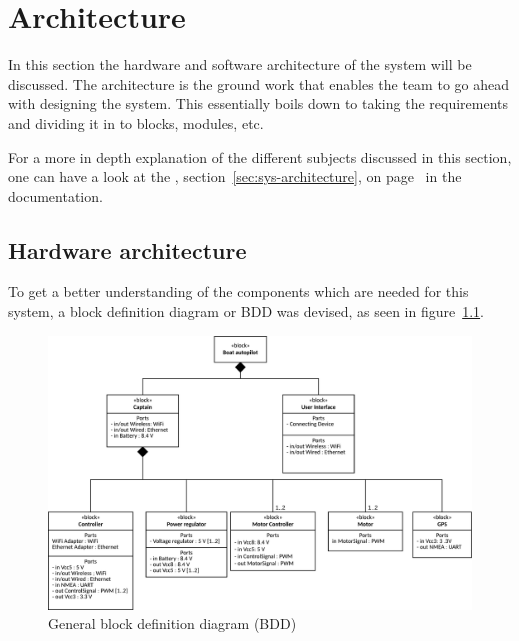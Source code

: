 \newpage
\chapter{Architecture}

In this section the hardware and software architecture of the system will be discussed. The architecture is the ground work that enables the team to go ahead with designing the system. This essentially boils down to taking the requirements and dividing it in to blocks, modules, etc.

For a more in depth explanation of the different subjects discussed in this section, one can have a look at the , section~\ref{sec:sys-architecture}, on page~\pageref{sec:sys-architecture} in the documentation.

\section{Hardware architecture}
To get a better understanding of the components which are needed for this system, a block definition diagram or BDD was devised, as seen in figure~\ref{fig:generalbdd}. 

\begin{figure}[H]
\centering
\includegraphics[width=1\linewidth]{../Appendix/Project/Dokumentation/Images/System_architecture/General_BDD}
\caption{General block definition diagram (BDD)}
\label{fig:generalbdd}
\end{figure}

